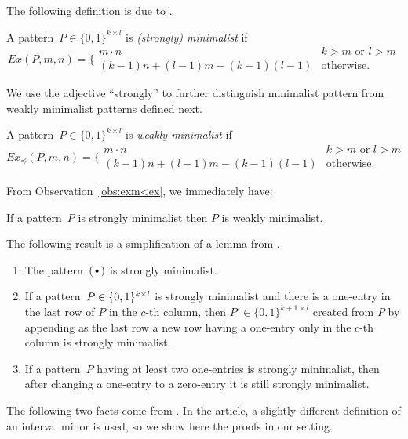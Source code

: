 The following definition is due to \cite{cibulka}.

\begin{defn}
A pattern~$P\in\{0,1\}^{k\times l}$ is \emph{(strongly) minimalist} if
$$Ex(P,m,n)=\Big\{\begin{array}{ll}
m\cdot n & k>m\text{ or } l>m \\
(k-1)n+(l-1)m-(k-1)(l-1) & \text{otherwise.}
\end{array}$$
\end{defn}

We use the adjective ``strongly'' to further distinguish minimalist pattern from weakly minimalist patterns defined next.

\begin{defn}
A pattern~$P\in\{0,1\}^{k\times l}$ is \emph{weakly minimalist} if
$$Ex_{\preceq}(P,m,n)=\Big\{\begin{array}{ll}
m\cdot n & k>m\text{ or } l>m \\
(k-1)n+(l-1)m-(k-1)(l-1) & \text{otherwise.}
\end{array}$$
\end{defn}

From Observation~\ref{obs:exm<ex}, we immediately have:

\begin{obs}
\label{obs:strongweak}
If a pattern~$P$ is strongly minimalist then $P$ is weakly minimalist.
\end{obs}

The following result is a simplification of a lemma from \cite{cibulka}.

\begin{fct}
\label{fct:minimalist}
\begin{enumerate}
	\item The pattern~$\left(\begin{smallmatrix}\bullet\end{smallmatrix}\right)$ is strongly minimalist.
	\item If a pattern~$P\in\{0,1\}^{k\times l}$ is strongly minimalist and there is a one-entry in the last row of $P$ in the $c$-th column, then $P'\in\{0,1\}^{k+1\times l}$ created from $P$ by appending as the last row a new row having a one-entry only in the $c$-th column is strongly minimalist.
	\item If a pattern~$P$ having at least two one-entries is strongly minimalist, then after changing a one-entry to a zero-entry it is still strongly minimalist.
\end{enumerate}
\end{fct}

The following two facts come from \cite{bigraphs}. In the article, a slightly different definition of an interval minor is used, so we show here the proofs in our setting.

